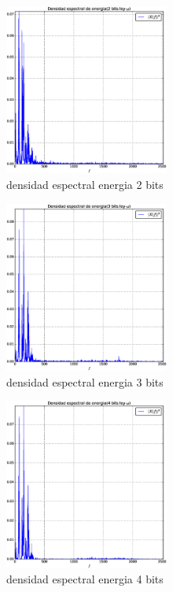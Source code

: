\documentclass[10pt]{article}
\begin{document}
\begin{figure}[H]
   \centering
   \includegraphics[width=0.48\textwidth]{./Images/densidad_espectral_x_2.eps}
   \caption{densidad espectral energia 2 bits}\label{fig:densidad_x_2}     
\end{figure}

\begin{figure}[H]
   \centering
   \includegraphics[width=0.48\textwidth]{./Images/densidad_espectral_x_3.eps}
   \caption{densidad espectral energia 3 bits}\label{fig:densidad_x_3}     
\end{figure}

\begin{figure}[H]
   \centering
   \includegraphics[width=0.48\textwidth]{./Images/densidad_espectral_x_4.eps}
   \caption{densidad espectral energia 4 bits}\label{fig:densidad_x_4}     
\end{figure}
\end{document}
